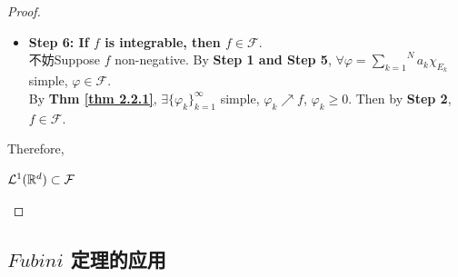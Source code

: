 \begin{proof}
\begin{itemize}
 			\newpage
 			
 			\item \textbf{Step 6: If $f$ is integrable, then $f \in \mathcal{F}$}. \\
 			不妨Suppose $f$ non-negative. By \textbf{Step 1 and Step 5}, $\forall \varphi = \overset{N}{\underset{k = 1}{\sum}}{a_k \chi_{E_k}}$ simple, $\varphi \in \mathcal{F}$. \\
 			By \textbf{Thm \ref{thm 2.2.1}}, $\exists \{ \varphi_{k} \}_{k = 1}^{\infty}$ simple, $\varphi_k \nearrow f$, $\varphi_k \geq 0$. Then by \textbf{Step 2}, $f \in \mathcal{F}$.
		\end{itemize}
	
		\vspace{2em}
		
		Therefore, 
		\begin{center}
			$\mathcal{L}^{1}(\mathbb{R}^d) \subset \mathcal{F}$
		\end{center}
	\end{proof}

\newpage
\subsection{$Fubini$ 定理的应用}
